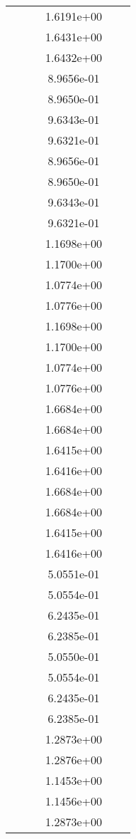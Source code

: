 \begin{xltabular}{\textwidth}{r|rS[table-format=1.3e+2]S[table-format=1.4e+2]S[table-format=1.4e+2]S[table-format=-1.5]}
&  &  & 1.6191e+00 & & \\
&  &  & 1.6431e+00 & & \\
&  &  & 1.6432e+00 & & \\
&  &  & 8.9656e-01 & & \\
&  &  & 8.9650e-01 & & \\
&  &  & 9.6343e-01 & & \\
&  &  & 9.6321e-01 & & \\
&  &  & 8.9656e-01 & & \\
&  &  & 8.9650e-01 & & \\
&  &  & 9.6343e-01 & & \\
&  &  & 9.6321e-01 & & \\
&  &  & 1.1698e+00 & & \\
&  &  & 1.1700e+00 & & \\
&  &  & 1.0774e+00 & & \\
&  &  & 1.0776e+00 & & \\
&  &  & 1.1698e+00 & & \\
&  &  & 1.1700e+00 & & \\
&  &  & 1.0774e+00 & & \\
&  &  & 1.0776e+00 & & \\
&  &  & 1.6684e+00 & & \\
&  &  & 1.6684e+00 & & \\
&  &  & 1.6415e+00 & & \\
&  &  & 1.6416e+00 & & \\
&  &  & 1.6684e+00 & & \\
&  &  & 1.6684e+00 & & \\
&  &  & 1.6415e+00 & & \\
&  &  & 1.6416e+00 & & \\
&  &  & 5.0551e-01 & & \\
&  &  & 5.0554e-01 & & \\
&  &  & 6.2435e-01 & & \\
&  &  & 6.2385e-01 & & \\
&  &  & 5.0550e-01 & & \\
&  &  & 5.0554e-01 & & \\
&  &  & 6.2435e-01 & & \\
&  &  & 6.2385e-01 & & \\
&  &  & 1.2873e+00 & & \\
&  &  & 1.2876e+00 & & \\
&  &  & 1.1453e+00 & & \\
&  &  & 1.1456e+00 & & \\
&  &  & 1.2873e+00 & & \\

\end{xltabular}

